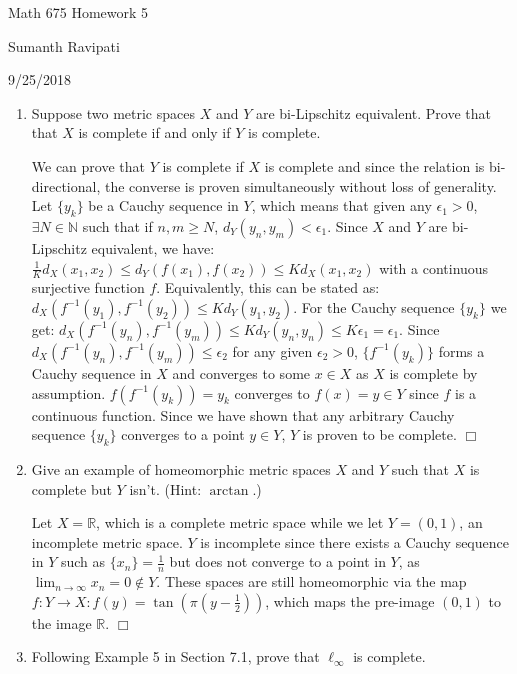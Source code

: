 \documentclass[12pt,letterpaper,reqno]{amsart}
\newcommand{\R}{\mathbb R}
\newcommand{\N}{\mathbb N}
\begin{document}
\thispagestyle{empty}
\centerline{\Large Math 675 Homework 5}
\centerline{Sumanth Ravipati}
\centerline{9/25/2018}
\vspace{.15in}
\begin{enumerate}[1.]
\item Suppose two metric spaces $X$ and $Y$ are bi-Lipschitz equivalent. Prove that that $X$ is complete if and only if $Y$ is complete.
\begin{flushleft}
We can prove that $Y$ is complete if $X$ is complete and since the relation is bi-directional, the converse is proven simultaneously without loss of generality. Let $\{y_k\}$ be a Cauchy sequence in $Y$, which means that given any $\epsilon_1 > 0$, $\exists N \in \N$ such that if $n, m \geq N$, $d_Y(y_n, y_m) < \epsilon_1$. Since $X$ and $Y$ are bi-Lipschitz equivalent, we have: $\frac{1}{K}d_X(x_1, x_2) \leq d_Y(f(x_1), f(x_2)) \leq Kd_X(x_1, x_2)$ with a continuous surjective function $f$. Equivalently, this can be stated as: $d_X(f^{-1}(y_1), f^{-1}(y_2)) \leq Kd_Y(y_1, y_2)$. For the Cauchy sequence $\{y_k\}$ we get: $d_X(f^{-1}(y_n), f^{-1}(y_m)) \leq Kd_Y(y_n, y_n) \leq K\epsilon_1 = \epsilon_1$. Since $d_X(f^{-1}(y_n), f^{-1}(y_m)) \leq \epsilon_2$ for any given $\epsilon_2 > 0$, $\{f^{-1}(y_k)\}$ forms a Cauchy sequence in $X$ and converges to some $x \in X$ as $X$ is complete by assumption. $f(f^{-1}(y_k)) = y_k$ converges to $f(x) = y \in Y$ since $f$ is a continuous function. Since we have shown that any arbitrary Cauchy sequence $\{y_k\}$ converges to a point $y \in Y$, $Y$ is proven to be complete. $\Box$
\end{flushleft}
\item Give an example of homeomorphic metric spaces $X$ and $Y$ such that $X$ is complete but $Y$ isn't. (Hint: $\arctan$.)
\begin{flushleft}
Let $X = \R$, which is a complete metric space while we let $Y = (0,1)$, an incomplete metric space. $Y$ is incomplete since there exists a Cauchy sequence in $Y$ such as $\{x_n\} = \frac{1}{n}$ but does not converge to a point in $Y$, as $\lim_{n\rightarrow\infty}x_n = 0 \not\in Y$. These spaces are still homeomorphic via the map $f:Y\rightarrow X: f(y) = \tan(\pi(y-\frac{1}{2}))$, which maps the pre-image $(0,1)$ to the image $\R$. $\Box$
\end{flushleft}
\item Following Example 5 in Section 7.1, prove that $\ell_\infty$ is complete.
\begin{flushleft}

\end{flushleft}
\end{enumerate}
\end{document}
